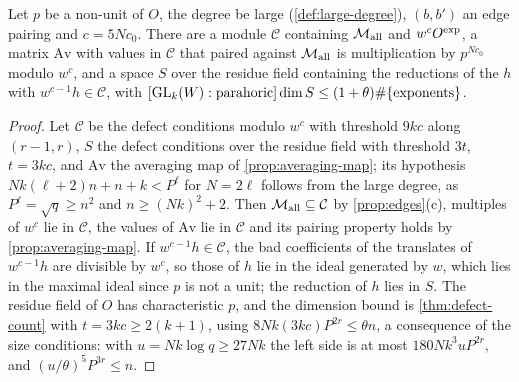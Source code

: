 \begin{proposition}\label{prop:edge-condition}
Let $p$ be a non-unit of $O$, the degree be large (\cref{def:large-degree}), $(b,b')$ an edge pairing and $c=5Nc_0$. There are a module $\mathcal C$ containing
$\mathcal M_{\rm all}$ and $w^c O^{\rm exp}$, a matrix $\mathrm{Av}$ with values in $\mathcal C$ that paired against $\mathcal M_{\rm all}$ is multiplication by $p^{Nc_0}$ modulo $w^c$, and a space $S$ over
the residue field containing the reductions of the $h$ with $w^{c-1}h\in\mathcal C$, with $[\operatorname{GL}_k(W):\text{parahoric}]\dim S\le(1+\theta)\#\{\text{exponents}\}$.
\end{proposition}

\begin{proof}
Let $\mathcal C$ be the defect conditions modulo $w^c$ with threshold $9kc$ along $(r-1,r)$, $S$ the defect conditions over the residue field with threshold $3t$, $t=3kc$, and $\mathrm{Av}$ the averaging map of \cref{prop:averaging-map}; its hypothesis $Nk(\ell+2)n+n+k<P^\ell$ for $N=2\ell$ follows from the large degree, as $P^\ell=\sqrt q\ge n^2$ and $n\ge(Nk)^2+2$. Then $\mathcal M_{\rm all}\subseteq\mathcal C$ by \cref{prop:edges}(c),
multiples of $w^c$ lie in $\mathcal C$, the values of $\mathrm{Av}$ lie in $\mathcal C$ and its pairing property holds by \cref{prop:averaging-map}. If $w^{c-1}h\in\mathcal C$, the bad coefficients of the translates of $w^{c-1}h$ are divisible by $w^c$, so those of $h$ lie in the ideal generated by $w$, which lies in the maximal ideal since $p$ is not a unit; the reduction of $h$ lies in $S$. The residue field of $O$
has characteristic $p$, and the dimension bound is \cref{thm:defect-count} with $t=3kc\ge2(k+1)$, using $8Nk(3kc)P^{2r}\le\theta n$, a consequence of the size conditions: with $u=Nk\log q\ge27Nk$ the left side is at most $180Nk^3uP^{2r}$, and $(u/\theta)^5P^{3r}\le n$.
\end{proof}

